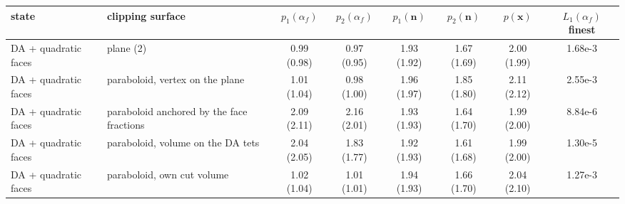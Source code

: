 \begin{tabular}{llcccccc}
\toprule
state & clipping surface & $p_1(\alpha_f)$ & $p_2(\alpha_f)$ & $p_1(\mathbf{n})$ & $p_2(\mathbf{n})$ & $p(\mathbf{x})$ & $L_1(\alpha_f)$ finest \\
\midrule
DA + quadratic faces & plane (2) & 0.99 (0.98) & 0.97 (0.95) & 1.93 (1.92) & 1.67 (1.69) & 2.00 (1.99) & 1.68e-3 \\
DA + quadratic faces & paraboloid, vertex on the plane & 1.01 (1.04) & 0.98 (1.00) & 1.96 (1.97) & 1.85 (1.80) & 2.11 (2.12) & 2.55e-3 \\
DA + quadratic faces & paraboloid anchored by the face fractions & 2.09 (2.11) & 2.16 (2.01) & 1.93 (1.93) & 1.64 (1.70) & 1.99 (2.00) & 8.84e-6 \\
DA + quadratic faces & paraboloid, volume on the DA tets & 2.04 (2.05) & 1.83 (1.77) & 1.92 (1.93) & 1.61 (1.68) & 1.99 (2.00) & 1.30e-5 \\
DA + quadratic faces & paraboloid, own cut volume & 1.02 (1.04) & 1.01 (1.01) & 1.94 (1.93) & 1.66 (1.70) & 2.04 (2.10) & 1.27e-3 \\
\bottomrule
\end{tabular}
